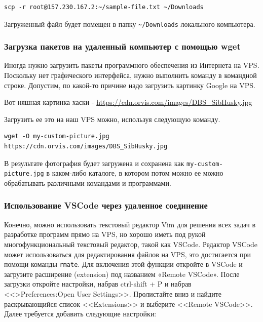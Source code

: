 \documentclass[12pt]{article}
\begin{document}
\begin{verbatim}
scp -r root@157.230.167.2:~/sample-file.txt ~/Downloads
\end{verbatim}

Загруженный файл будет помещен в папку
\texttt{\textasciitilde{}/Downloads} локального компьютера.

\hypertarget{Downloading-packages-to-your-remote-machine-with-wget}{%
\subsubsection{\texorpdfstring{\protect\hyperlink{Downloading-packages-to-your-remote-machine-with-wget}{}Загрузка
пакетов на удаленный компьютер с помощью
wget}{Загрузка пакетов на удаленный компьютер с помощью wget}}\label{Downloading-packages-to-your-remote-machine-with-wget}}

Иногда нужно загрузить пакеты программного обеспечения из Интернета на
VPS. Поскольку нет графического интерфейса, нужно выполнить команду в
командной строке. Допустим, по какой-то причине надо загрузить картинку
Google на VPS.

Вот няшная картинка хаски -
\url{https://cdn.orvis.com/images/DBS_SibHusky.jpg}

Загрузить ее это на наш VPS можно, используя следующую команду.

\begin{verbatim}
wget -O my-custom-picture.jpg https://cdn.orvis.com/images/DBS_SibHusky.jpg
\end{verbatim}

В результате фотография будет загружена и сохранена как
\texttt{my-custom-picture.jpg} в каком-либо каталоге, в котором потом
можно ее можно обрабатывать различными командами и программами.

\hypertarget{Using-VSCode-with-your-remote-machine}{%
\subsubsection{\texorpdfstring{\protect\hyperlink{Using-VSCode-with-your-remote-machine}{}Использование
VSCode через удаленное
соединение}{Использование VSCode через удаленное соединение}}\label{Using-VSCode-with-your-remote-machine}}

Конечно, можно использовать текстовый редактор Vim для решения всех
задач в разработке программ прямо на VPS, но хорошо иметь под рукой
многофункциональный текстовый редактор, такой как VSCode. Редактор
VSCode может использоваться для редактирования файлов на VPS, это
достигается при помощи команды \texttt{rmate}. Для включения этой
функции откройте в VSCode и загрузите расширение (extension) под
названием «Remote VSCode». После загрузки откройте настройки, набрав
ctrl-shift + P и набрав <<\textgreater Preferences:Open User Settings>>.
Пролистайте вниз и найдите раскрывающийся список <<Extensions>> и выберите
<<Remote VSCode>>. Далее требуется добавить следующие настройки:
\end{document}
